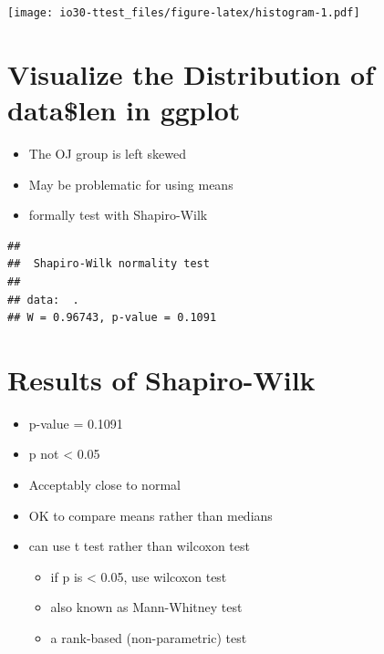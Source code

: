 \documentclass[
]{book}
\newenvironment{Shaded}{\begin{snugshade}}{\end{snugshade}}
\newcommand{\KeywordTok}[1]{\textcolor[rgb]{0.13,0.29,0.53}{\textbf{#1}}}
\newcommand{\NormalTok}[1]{#1}
\newcommand{\OperatorTok}[1]{\textcolor[rgb]{0.81,0.36,0.00}{\textbf{#1}}}
\newcommand{\StringTok}[1]{\textcolor[rgb]{0.31,0.60,0.02}{#1}}
\providecommand{\tightlist}{%
  \setlength{\itemsep}{0pt}\setlength{\parskip}{0pt}}
\begin{document}
\texttt{[image: io30-ttest\_files/figure-latex/histogram-1.pdf]}

\hypertarget{visualize-the-distribution-of-datalen-in-ggplot-1}{%
\section{Visualize the Distribution of data\$len in ggplot}\label{visualize-the-distribution-of-datalen-in-ggplot-1}}

\begin{itemize}
\tightlist
\item
  The OJ group is left skewed
\item
  May be problematic for using means
\item
  formally test with Shapiro-Wilk
\end{itemize}

\begin{Shaded}
\end{Shaded}

\begin{verbatim}
## 
##  Shapiro-Wilk normality test
## 
## data:  .
## W = 0.96743, p-value = 0.1091
\end{verbatim}

\hypertarget{results-of-shapiro-wilk}{%
\section{Results of Shapiro-Wilk}\label{results-of-shapiro-wilk}}

\begin{itemize}
\tightlist
\item
  p-value = 0.1091
\item
  p not \textless{} 0.05
\item
  Acceptably close to normal
\item
  OK to compare means rather than medians
\item
  can use t test rather than wilcoxon test

  \begin{itemize}
  \tightlist
  \item
    if p is \textless{} 0.05, use wilcoxon test
  \item
    also known as Mann-Whitney test
  \item
    a rank-based (non-parametric) test
  \end{itemize}
\end{itemize}
\end{document}
